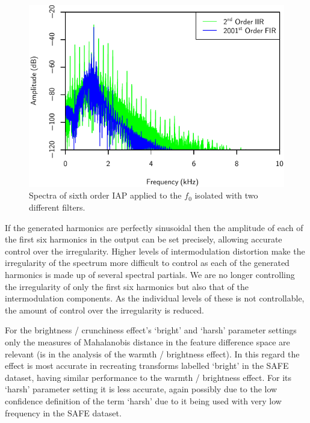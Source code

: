 			\begin{figure}[h!]
				\centering
				\includegraphics{chapter7/Images/CelloFilterOrderSpectra.pdf}
				\caption{Spectra of sixth order IAP applied to the $f_{0}$ isolated with two different
					 filters.}
				\label{fig:CelloFilterOrderSpectra}
			\end{figure}

			If the generated harmonics are perfectly sinusoidal then the amplitude of each of the first six
			harmonics in the output can be set precisely, allowing accurate control over the irregularity.
			Higher levels of intermodulation distortion make the irregularity of the spectrum more difficult to
			control as each of the generated harmonics is made up of several spectral partials. We are no
			longer controlling the irregularity of only the first six harmonics but also that of the
			intermodulation components. As the individual levels of these is not controllable, the amount of
			control over the irregularity is reduced.

			For the brightness / crunchiness effect's `bright' and `harsh' parameter settings only the measures
			of Mahalanobis distance in the feature difference space are relevant (is in the analysis of the
			warmth / brightness effect). In this regard the effect is most accurate in recreating transforms
			labelled `bright' in the SAFE dataset, having similar performance to the warmth / brightness
			effect.  For its `harsh' parameter setting it is less accurate, again possibly due to the low
			confidence definition of the term `harsh' due to it being used with very low frequency in the SAFE
			dataset.

